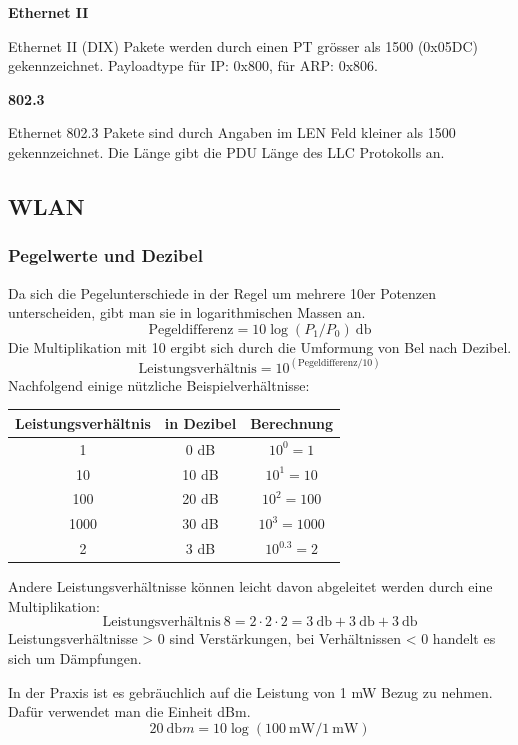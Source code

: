 \textbf{Ethernet II}

Ethernet II (DIX) Pakete werden durch einen PT grösser als 1500
(0x05DC) gekennzeichnet. Payloadtype für IP: 0x800, für ARP: 0x806.

\textbf{802.3}

Ethernet 802.3 Pakete sind durch Angaben im LEN Feld kleiner als 1500
gekennzeichnet. Die Länge gibt die PDU Länge des LLC Protokolls an.


\subsection{WLAN}

\subsubsection{Pegelwerte und Dezibel}

Da sich die Pegelunterschiede in der Regel um mehrere 10er Potenzen unterscheiden,
gibt man sie in logarithmischen Massen an.
\[
	\textrm{Pegeldifferenz} = 10 \log (P_1/P_0)~\si{\decibel}
\]
Die Multiplikation mit 10 ergibt sich durch die Umformung von Bel nach Dezibel.
\[
	\textrm{Leistungsverhältnis} = 10^{(\textrm{Pegeldifferenz}/10)}
\]
Nachfolgend einige nützliche Beispielverhältnisse:

\begin{tabular}{|c|c|c|}
	\hline
	\textbf{Leistungsverhältnis} & \textbf{in Dezibel} & \textbf{Berechnung} \\
	\hline
	1 & 0 dB & $10^0=1$ \\
	\hline
	10 & 10 dB & $10^1=10$ \\
	\hline
	100 & 20 dB & $10^2=100$ \\
	\hline
	1000 & 30 dB & $10^3=1000$ \\
	\hline
	2 & 3 dB & $10^0.3=2$ \\
	\hline
\end{tabular}

Andere Leistungsverhältnisse können leicht davon abgeleitet werden durch eine Multiplikation:
\[
	\textrm{Leistungsverhältnis}~8 = 2 \cdot 2 \cdot 2 = \SI{3}{\decibel} + \SI{3}{\decibel} + \SI{3}{\decibel}
\]
Leistungsverhältnisse > 0 sind Verstärkungen, bei Verhältnissen < 0 handelt es sich um Dämpfungen.

In der Praxis ist es gebräuchlich auf die Leistung von 1 mW Bezug zu nehmen.
Dafür verwendet man die Einheit dBm.
\[
	\SI{20}{\decibel m} = 10 \log (\SI{100}{\milli\watt}/\SI{1}{\milli\watt})
\]


